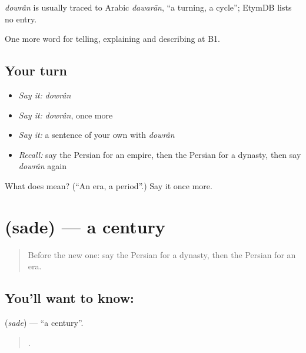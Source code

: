 \begin{cousinweb}
\emph{dowrân} is usually traced to Arabic \emph{dawarān}, \textquotedblleft{}a turning, a cycle\textquotedblright{}; EtymDB lists no entry.
\end{cousinweb}

\begin{grammarlens}[title={What you've built}]
One more word for telling, explaining and describing at B1.
\end{grammarlens}

\subsection*{Your turn}
\begin{itemize}
\raggedright
  \item \emph{Say it:} \emph{dowrân}
  \item \emph{Say it:} \emph{dowrân}, once more
  \item \emph{Say it:} a sentence of your own with \emph{dowrân}
  \item \emph{Recall:} say the Persian for an empire, then the Persian for a dynasty, then say \emph{dowrân} again
\end{itemize}

\begin{tcolorbox}[breakable,colback=teal!4,colframe=teal!35!black,title={Before you move on}]
What does  mean? (\textquotedblleft{}An era, a period\textquotedblright{}.) Say it once more.
\end{tcolorbox}
\section[\texorpdfstring{\fa{سده} (sade)}{سده (sade)}]{ (sade) — a century}

\label{lesson:FA-C353-sade}



\begin{quote}
Before the new one: say the Persian for a dynasty, then the Persian for an era.
\end{quote}

\subsection*{You'll want to know: }
\textbf{} (\emph{sade}) — \textquotedblleft{}a century\textquotedblright{}.

\begin{quote}
      .
\end{quote}

